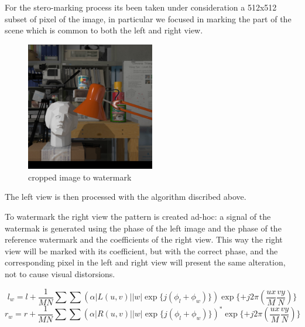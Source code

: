 For the stero-marking process its been taken under consideration a 512x512 subset of pixel of the image, in particular we focused in marking the part of the scene which is common to both the left and right view.

\begin{figure}[h!]
\centering
\includegraphics[width=0.5\textwidth]{./img/squared.png}
\caption{\small{cropped image to watermark}}
\label{fig:cropped}
\end{figure}

The left view is then processed with the algorithm discribed above.\newline 

To watermark the right view the pattern is created ad-hoc: a signal of the watermak is generated using the phase of the left image and the phase of the reference watermark and  the coefficients of the right view.\newline  
This way the right view will be marked with its coefficient, but with the correct phase, and the corresponding pixel in the left and right view will present the same alteration, not to cause visual distorsions.

$$ l_{w} = l + \frac{1}{MN}\sum\sum(\alpha|L(u,v)||w|\exp\{j(\phi_{l}+\phi_{w})\})\exp\{+j2\pi(\frac{ux}{M}\frac{vy}{N})\} $$
$$ r_{w} = r + \frac{1}{MN}\sum\sum(\alpha|R(u,v)||w|\exp\{j(\phi_{l}+\phi_{w})\})^{*}\exp\{+j2\pi(\frac{ux}{M}\frac{vy}{N})\} $$


